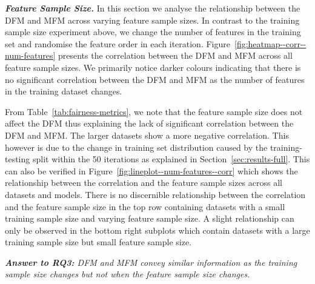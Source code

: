 \documentclass{article}
\newcommand{\highlight}[1]{\begin{framed}%
  \noindent\emph{#1}
\end{framed}}
\begin{document}
\textbf{\emph{Feature Sample Size.}} In this section we analyse the
relationship between the DFM and MFM across varying feature sample
sizes. In contrast to the training sample size experiment above, we
change the number of features in the training set and randomise the
feature order in each
iteration. Figure \ref{fig:heatmap--corr--num-features} presents the
correlation between the DFM and MFM across all feature sample
sizes. We primarily notice darker colours indicating that there is no
significant correlation between the DFM and MFM as the number of
features in the training dataset changes.

From Table \ref{tab:fairness-metrics}, we note that the feature sample
size does not affect the DFM thus explaining the lack of significant
correlation between the DFM and MFM. The larger datasets show a more
negative correlation. This however is due to the change in training
set distribution caused by the training-testing split within the 50
iterations as explained in Section \ref{sec:results-full}. This can
also be verified in Figure \ref{fig:lineplot--num-features--corr}
which shows the relationship between the correlation and the feature
sample sizes across all datasets and models. There is no discernible
relationship between the correlation and the feature sample size in
the top row containing datasets with a small training sample size and
varying feature sample size. A slight relationship can only be
observed in the bottom right subplots which contain datasets with
a large training sample size but small feature sample size.

\highlight{\textbf{Answer to RQ3:} DFM and MFM convey similar
information as the training sample size changes but not when the
feature sample size changes.}
\end{document}
